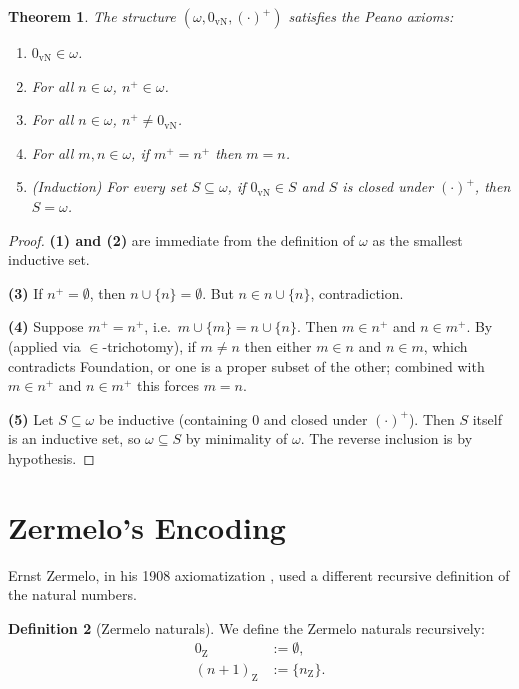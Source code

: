 \documentclass[12pt]{article}
\newtheorem{theorem}{Theorem}[section]
\theoremstyle{definition}
\newtheorem{definition}[theorem]{Definition}
\theoremstyle{remark}
\begin{document}
\begin{theorem}\label{thm:peano-vN}
The structure $(\omega, 0_{\mathrm{vN}}, (\cdot)^+)$ satisfies the Peano axioms:
\begin{enumerate}
\item $0_{\mathrm{vN}} \in \omega$.
\item For all $n \in \omega$, $n^+ \in \omega$.
\item For all $n \in \omega$, $n^+ \neq 0_{\mathrm{vN}}$.
\item For all $m,n \in \omega$, if $m^+ = n^+$ then $m = n$.
\item (Induction) For every set $S \subseteq \omega$, if $0_{\mathrm{vN}} \in S$
and $S$ is closed under $(\cdot)^+$, then $S = \omega$.
\end{enumerate}
\end{theorem}

\begin{proof}
\textbf{(1) and (2)} are immediate from the definition of $\omega$ as the
smallest inductive set.

\textbf{(3)} If $n^+ = \emptyset$, then $n \cup \{n\} = \emptyset$. But
$n \in n \cup \{n\}$, contradiction.

\textbf{(4)} Suppose $m^+ = n^+$, i.e.\ $m \cup \{m\} = n \cup \{n\}$. Then
$m \in n^+$ and $n \in m^+$. By  (applied via
$\in$-trichotomy), if $m \neq n$ then either $m \in n$ and $n \in m$, which
contradicts Foundation, or one is a proper subset of the other; combined
with $m \in n^+$ and $n \in m^+$ this forces $m = n$.

\textbf{(5)} Let $S \subseteq \omega$ be inductive (containing $0$ and
closed under $(\cdot)^+$). Then $S$ itself is an inductive set, so
$\omega \subseteq S$ by minimality of $\omega$. The reverse inclusion is by
hypothesis.
\end{proof}

\section{Zermelo's Encoding}
\label{sec:zermelo}

Ernst Zermelo, in his 1908 axiomatization \cite{zermelo1908}, used a
different recursive definition of the natural numbers.

\begin{definition}[Zermelo naturals]\label{def:Z}
We define the Zermelo naturals recursively:
\begin{align}
0_{\mathrm{Z}} &:= \emptyset, \\
(n+1)_{\mathrm{Z}} &:= \{n_{\mathrm{Z}}\}.
\end{align}
\end{definition}
\end{document}
